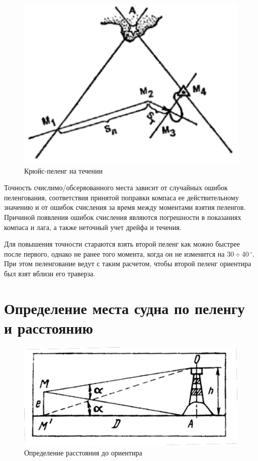 \documentclass[a4paper, 12pt, twoside, final, book, russian, fittopage, cyremdash]{ncc}
\newcommand{\gr}{\ensuremath{\,^\circ}\xspace}
\newcommand{\otdo}{\,\ensuremath{\div}\,}
\begin{document}
\begin{figure}[htb]
  \centering{}
  \includegraphics{N047}
  \caption{Крюйс-пеленг на течении}
  \label{fig:N47}
\end{figure}

Точность счислимо\-/обсервованного места зависит от случайных ошибок пеленгования, соответствия принятой поправки компаса ее действительному значению и от ошибок счисления за время между моментами взятия пеленгов. Причиной появления ошибок счисления являются погрешности в показаниях компаса и лага, а также неточный учет дрейфа и течения. 

Для повышения точности стараются взять второй пеленг как можно быстрее после первого, однако не ранее того момента, когда он не изменится на 30\otdo 40\gr. При этом пеленгование ведут с таким расчетом, чтобы второй пеленг ориентира был взят вблизи его траверза. 

\section{Определение места судна по пеленгу и расстоянию}

\begin{figure}[htb]
  \centering{}
  \includegraphics{N048}
  \caption{Определение расстояния до ориентира}
  \label{fig:N48}
\end{figure}
\end{document}
